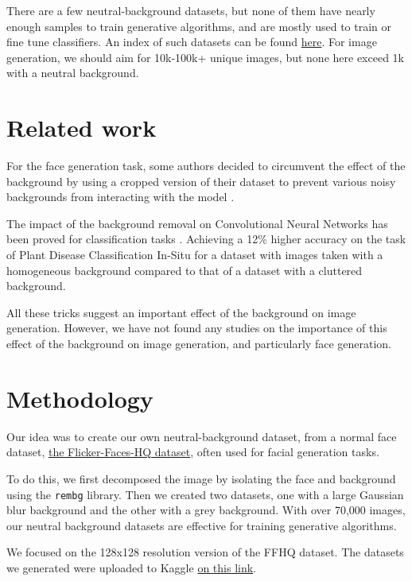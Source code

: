 \documentclass{article}
\begin{document}
There are a few neutral-background datasets, but none of them have nearly enough samples to train generative algorithms, and are mostly used to train or fine tune classifiers. 
An index of such datasets can be found \href{https://libguides.princeton.edu/facedatabases}{here}. 
For image generation, we should aim for 10k-100k+ unique images, but none here exceed 1k with a neutral background.

\section{Related work}

\quad For the face generation task, some authors decided to circumvent the effect of the background by using a cropped version of their dataset to prevent various noisy backgrounds from interacting with the model \cite{gauthier2014conditional}. 

The impact of the background removal on Convolutional Neural Networks has been proved for classification tasks \cite{kcyin2021impact}. Achieving a 12\% higher accuracy on the task of Plant Disease Classification In-Situ for a dataset with images taken with a homogeneous background compared to that of a dataset with a cluttered background.

All these tricks suggest an important effect of the background on image generation. 
However, we have not found any studies on the importance of this effect of the background on image generation, and particularly face generation.

\section{Methodology}

\quad Our idea was to create our own neutral-background dataset, from a normal face dataset, \hyperlink{https://github.com/NVlabs/ffhq-dataset}{the Flicker-Faces-HQ dataset}, often used for facial generation tasks. 

To do this, we first decomposed the image by isolating the face and background using the \texttt{rembg} library. 
Then we created two datasets, one with a large Gaussian blur background and the other with a grey background. 
With over 70,000 images, our neutral background datasets are effective for training generative algorithms.

We focused on the 128x128 resolution version of the FFHQ dataset.
The datasets we generated were uploaded to Kaggle \hyperlink{https://www.kaggle.com/thomaskientz/datasets}{on this link}.
\end{document}
